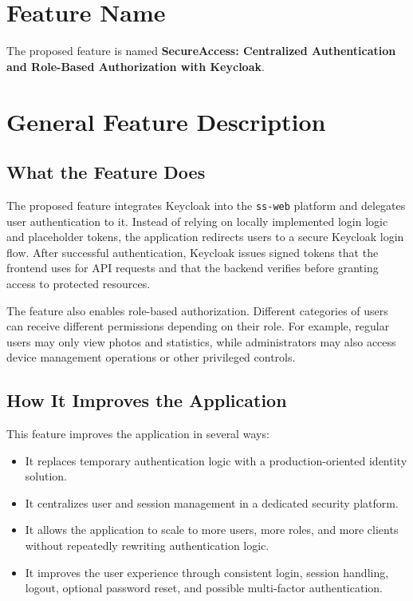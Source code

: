 \documentclass[conference]{IEEEtran}
\begin{document}
\section{Feature Name}

The proposed feature is named \textbf{SecureAccess: Centralized Authentication and Role-Based Authorization with Keycloak}.

\section{General Feature Description}

\subsection{What the Feature Does}

The proposed feature integrates Keycloak into the \texttt{ss-web} platform and delegates user authentication to it. Instead of relying on locally implemented login logic and placeholder tokens, the application redirects users to a secure Keycloak login flow. After successful authentication, Keycloak issues signed tokens that the frontend uses for API requests and that the backend verifies before granting access to protected resources.

The feature also enables role-based authorization. Different categories of users can receive different permissions depending on their role. For example, regular users may only view photos and statistics, while administrators may also access device management operations or other privileged controls.

\subsection{How It Improves the Application}

This feature improves the application in several ways:

\begin{itemize}
\item It replaces temporary authentication logic with a production-oriented identity solution.
\item It centralizes user and session management in a dedicated security platform.
\item It allows the application to scale to more users, more roles, and more clients without repeatedly rewriting authentication logic.
\item It improves the user experience through consistent login, session handling, logout, optional password reset, and possible multi-factor authentication.
\end{itemize}
\end{document}
